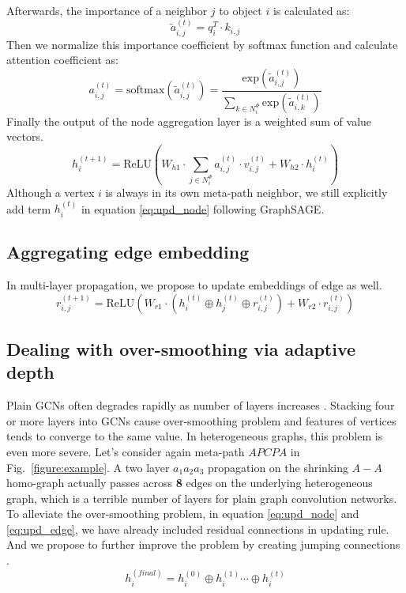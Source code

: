 \noindent Afterwards, the importance of a neighbor $j$ to object $i$ is calculated as:
\begin{equation}
\label{eq:dot}
\tilde{a}^{(t)}_{i,j} = q_i^T \cdot k_{i,j}
\end{equation}
Then we normalize this importance coefficient by softmax function and calculate attention coefficient as:
\begin{equation}
\label{eq:softmax}
a^{(t)}_{i,j} = \text{softmax}(\tilde{a}^{(t)}_{i,j}) = \dfrac{\text{exp}(\tilde{a}^{(t)}_{i,j})}{\sum_{k\in N^\Phi_i}\text{exp}(\tilde{a}^{(t)}_{i,k})}
\end{equation}
Finally the output of the node aggregation layer is a weighted sum of value vectors. 
\begin{equation}
\label{eq:upd_node}
h^{(t+1)}_i = \text{ReLU}( W_{h1}\cdot \sum_{j\in N^\Phi_i} a^{(t)}_{i,j} \cdot v^{(t)}_{i,j} + W_{h2}\cdot h^{(t)}_i) 
\end{equation} 
Although a vertex $i$ is always in its own meta-path neighbor, we still explicitly add term $h^{(t)}_i$ in equation \ref{eq:upd_node} following GraphSAGE\cite{HamiltonYL17}.

\subsection{Aggregating edge embedding}
 In multi-layer propagation, we propose to update embeddings of edge as well.
\begin{equation}
\label{eq:upd_edge}
r^{(t+1)}_{i,j} = \text{ReLU}(W_{r1}\cdot (h^{(t)}_i \oplus h^{(t)}_j \oplus r^{(t)}_{i,j}) + W_{r2}\cdot r^{(t)}_{i,j}) 
\end{equation} 

\subsection{Dealing with over-smoothing via adaptive depth}
Plain GCNs often degrades rapidly as number of layers increases \cite{LiHW18,abs-1904-03751}. Stacking four or more layers into GCNs cause over-smoothing problem and features of vertices tends to converge to the same value. In heterogeneous graphs, this problem is even more severe. Let's consider again meta-path $APCPA$ in Fig.~\ref{figure:example}. A two layer $a_1 a_2 a_3$ propagation on the shrinking $A-A$ homo-graph actually passes across \textbf{8} edges on the underlying heterogeneous graph, which is a terrible number of layers for plain graph convolution networks.
To alleviate the over-smoothing problem, in equation \ref{eq:upd_node} and \ref{eq:upd_edge}, we have already included residual connections \cite{HeZRS16} in updating rule. And we propose to further improve the problem by creating jumping connections \cite{XuLTSKJ18}.
\begin{equation}
\label{eq:jump}
h^{(final)}_i = h^{(0)}_i \oplus h^{(1)}_i \cdots \oplus h^{(t)}_i
\end{equation} 

